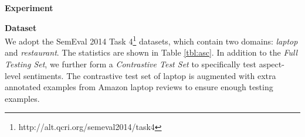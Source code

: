 
\textbf{Experiment}\\
\label{sec:exp}



\textbf{Dataset}\\

We adopt the SemEval 2014 Task 4\footnote{http://alt.qcri.org/semeval2014/task4} datasets, which 
contain two domains: \emph{laptop} and \emph{restaurant}. 
The statistics are shown in Table \ref{tbl:asc}. In addition to the \textit{Full Testing Set}, we further form a \textit{Contrastive Test Set} to specifically test aspect-level sentiments.
The contrastive test set of laptop is augmented with extra annotated examples from Amazon laptop reviews to ensure enough testing examples. 




